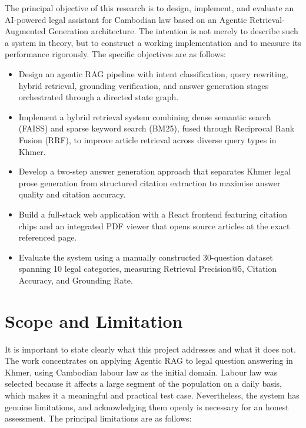 \hs The principal objective of this research is to design, implement, and evaluate an
AI-powered legal assistant for Cambodian law based on an Agentic Retrieval-Augmented
Generation architecture. The intention is not merely to describe such a system in
theory, but to construct a working implementation and to measure its performance
rigorously. The specific objectives are as follows:

\begin{itemize}
    \item Design an agentic RAG pipeline with intent classification, query rewriting,
    hybrid retrieval, grounding verification, and answer generation stages orchestrated
    through a directed state graph.

    \item Implement a hybrid retrieval system combining dense semantic search (FAISS)
    and sparse keyword search (BM25), fused through Reciprocal Rank Fusion (RRF), to
    improve article retrieval across diverse query types in Khmer.

    \item Develop a two-step answer generation approach that separates Khmer legal
    prose generation from structured citation extraction to maximise answer quality
    and citation accuracy.

    \item Build a full-stack web application with a React frontend featuring citation
    chips and an integrated PDF viewer that opens source articles at the exact
    referenced page.

    \item Evaluate the system using a manually constructed 30-question dataset spanning
    10 legal categories, measuring Retrieval Precision@5, Citation Accuracy, and
    Grounding Rate.
\end{itemize}

\section{Scope and Limitation}

\hs It is important to state clearly what this project addresses and what it does not.
The work concentrates on applying Agentic RAG to legal question answering in Khmer, using
Cambodian labour law as the initial domain. Labour law was selected because it affects a
large segment of the population on a daily basis, which makes it a meaningful and
practical test case. Nevertheless, the system has genuine limitations, and acknowledging
them openly is necessary for an honest assessment. The principal limitations are as
follows:


